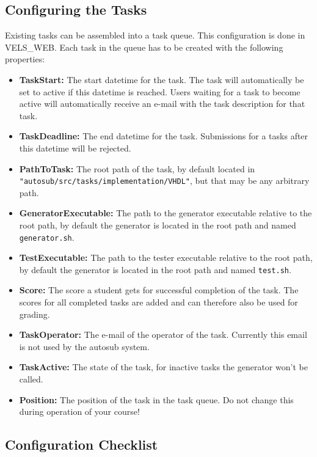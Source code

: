 \subsection{Configuring the Tasks} \label{sub:configTasks}
Existing tasks can be assembled into a task queue. This configuration is done in VELS\_WEB.
Each task in the queue has to be created with the following properties:
\begin{itemize}
\item {\bf TaskStart:} The start datetime for the task. The task will automatically
    be set to active if this datetime is reached. Users waiting for a task to become
    active will automatically receive an e-mail with the task description for that task.
\item {\bf TaskDeadline:} The end datetime for the task. Submissions for a tasks after
    this datetime will be rejected.
\item {\bf PathToTask:} The root path of the task, by default located in
    {\tt "autosub/src/tasks/implementation/VHDL"}, but that may be any arbitrary path.
\item {\bf GeneratorExecutable:} The path to the generator executable relative to the
    root path, by default the generator is located in the root path and named
    {\tt generator.sh}.
\item {\bf TestExecutable:} The path to the tester executable relative to the root path,
    by default the generator is located in the root path and named {\tt test.sh}.
\item {\bf Score:} The score a student gets for successful completion of the task. The
    scores for all completed tasks are added and can therefore also be used for grading.
\item {\bf TaskOperator:} The e-mail of the operator of the task. Currently this email
    is not used by the autosub system.
\item {\bf TaskActive:} The state of the task, for inactive tasks the generator won't
    be called.
\item {\bf Position:} The position of the task in the task queue. Do not change
    this during operation of your course!
\end{itemize}

\subsection{Configuration Checklist} \label{sub:configChecklist}

